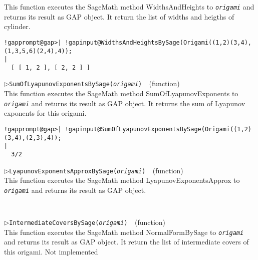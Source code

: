 \documentclass[a4paper,11pt]{report}
\begin{document}
{{{ This function executes the SageMath method WidthsAndHeights to \mbox{\texttt{\mdseries\slshape origami}} and returns its result as \textsf{GAP} object. It return the list of widths and heigths of cylinder. 
\begin{Verbatim}[commandchars=!@|,fontsize=\small,frame=single,label=Example]
  !gapprompt@gap>| !gapinput@WidthsAndHeightsBySage(Origami((1,2)(3,4),(1,3,5,6)(2,4),4));        
|
  [ [ 1, 2 ], [ 2, 2 ] ]
\end{Verbatim}
 \noindent\textcolor{FuncColor}{$\triangleright$\enspace\texttt{SumOfLyapunovExponentsBySage({\mdseries\slshape origami})
\label{SumOfLyapunovExponentsBySage}
}\hfill{\scriptsize (function)}}\\


 This function executes the SageMath method SumOfLyapunovExponents to \mbox{\texttt{\mdseries\slshape origami}} and returns its result as \textsf{GAP} object. It returns the sum of Lyapunov exponents for this origami. 
\begin{Verbatim}[commandchars=!@|,fontsize=\small,frame=single,label=Example]
  !gapprompt@gap>| !gapinput@SumOfLyapunovExponentsBySage(Origami((1,2)(3,4),(2,3),4));
|
  3/2
\end{Verbatim}
 \noindent\textcolor{FuncColor}{$\triangleright$\enspace\texttt{LyapunovExponentsApproxBySage({\mdseries\slshape origami})
\label{LyapunovExponentsApproxBySage}
}\hfill{\scriptsize (function)}}\\


 This function executes the SageMath method LyapunovExponentsApprox to \mbox{\texttt{\mdseries\slshape origami}} and returns its result as \textsf{GAP} object. 
\begin{Verbatim}[commandchars=!@|,fontsize=\small,frame=single,label=Example]
  
\end{Verbatim}
 \noindent\textcolor{FuncColor}{$\triangleright$\enspace\texttt{IntermediateCoversBySage({\mdseries\slshape origami})
\label{IntermediateCoversBySage}
}\hfill{\scriptsize (function)}}\\


 This function executes the SageMath method NormalFormBySage to \mbox{\texttt{\mdseries\slshape origami}} and returns its result as \textsf{GAP} object. It return the list of intermediate covers of this origami. Not
implemented 
\begin{Verbatim}[commandchars=!@|,fontsize=\small,frame=single,label=Example]
\end{Verbatim}
 }

 }

 }
\end{document}
